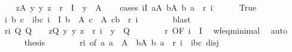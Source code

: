 \begin{isabellebody}
\ \ \isamarkupfalse%
\ {\isachardoublequoteopen}{\isasymexists}z{\isasymin}A{\isachardot}{\kern0pt}\ {\isasymforall}y{\isachardot}{\kern0pt}\ {\isacharparenleft}{\kern0pt}y{\isacharcomma}{\kern0pt}\ z{\isacharparenright}{\kern0pt}\ {\isasymin}\ {\isasymUnion}{\isacharparenleft}{\kern0pt}r\ {\isacharbackquote}{\kern0pt}\ I{\isacharparenright}{\kern0pt}\ {\isasymlongrightarrow}\ y\ {\isasymnotin}\ A{\isachardoublequoteclose}\isanewline
\ \ \isamarkupfalse%
\ {\isacharparenleft}{\kern0pt}cases\ {\isachardoublequoteopen}{\isasymexists}i{\isasymin}I{\isachardot}{\kern0pt}\ {\isasymexists}a{\isasymin}A{\isachardot}{\kern0pt}\ {\isasymexists}b{\isasymin}A{\isachardot}{\kern0pt}\ {\isacharparenleft}{\kern0pt}b{\isacharcomma}{\kern0pt}\ a{\isacharparenright}{\kern0pt}\ {\isasymin}\ r\ i{\isachardoublequoteclose}{\isacharparenright}{\kern0pt}\isanewline
\ \ \ \ \isamarkupfalse%
\ True\isanewline
\ \ \ \ \isamarkupfalse%
\ \isamarkupfalse%
\ i\ b\ c\ \ ibc{\isacharcolon}{\kern0pt}\ {\isachardoublequoteopen}i\ {\isasymin}\ I{\isachardoublequoteclose}\ {\isachardoublequoteopen}b\ {\isasymin}\ A{\isachardoublequoteclose}\ {\isachardoublequoteopen}c\ {\isasymin}\ A{\isachardoublequoteclose}\ {\isachardoublequoteopen}{\isacharparenleft}{\kern0pt}c{\isacharcomma}{\kern0pt}b{\isacharparenright}{\kern0pt}\ {\isasymin}\ r\ i{\isachardoublequoteclose}\isanewline
\ \ \ \ \ \ \isamarkupfalse%
\ blast\isanewline
\ \ \ \ \isamarkupfalse%
\ ri{\isacharcolon}{\kern0pt}\ {\isachardoublequoteopen}{\isasymAnd}Q{\isachardot}{\kern0pt}\ Q\ {\isasymnoteq}\ {\isacharbraceleft}{\kern0pt}{\isacharbraceright}{\kern0pt}\ {\isasymLongrightarrow}\ {\isasymexists}z{\isasymin}Q{\isachardot}{\kern0pt}\ {\isasymforall}y{\isachardot}{\kern0pt}\ {\isacharparenleft}{\kern0pt}y{\isacharcomma}{\kern0pt}\ z{\isacharparenright}{\kern0pt}\ {\isasymin}\ r\ i\ {\isasymlongrightarrow}\ y\ {\isasymnotin}\ Q{\isachardoublequoteclose}\isanewline
\ \ \ \ \ \ \isamarkupfalse%
\ r\ {\isacharbrackleft}{\kern0pt}OF\ {\isacartoucheopen}i\ {\isasymin}\ I{\isacartoucheclose}{\isacharbrackright}{\kern0pt}\ \isamarkupfalse%
\ wf{\isacharunderscore}{\kern0pt}eq{\isacharunderscore}{\kern0pt}minimal\ \isamarkupfalse%
\ auto\isanewline
\ \ \ \ \isamarkupfalse%
\ {\isacharquery}{\kern0pt}thesis\isanewline
\ \ \ \ \ \ \isamarkupfalse%
\ ri\ {\isacharbrackleft}{\kern0pt}of\ {\isachardoublequoteopen}{\isacharbraceleft}{\kern0pt}a{\isachardot}{\kern0pt}\ a\ {\isasymin}\ A\ {\isasymand}\ {\isacharparenleft}{\kern0pt}{\isasymexists}b{\isasymin}A{\isachardot}{\kern0pt}\ {\isacharparenleft}{\kern0pt}b{\isacharcomma}{\kern0pt}\ a{\isacharparenright}{\kern0pt}\ {\isasymin}\ r\ i{\isacharparenright}{\kern0pt}\ {\isacharbraceright}{\kern0pt}{\isachardoublequoteclose}{\isacharbrackright}{\kern0pt}\ ibc\ disj\isanewline

\end{isabellebody}
